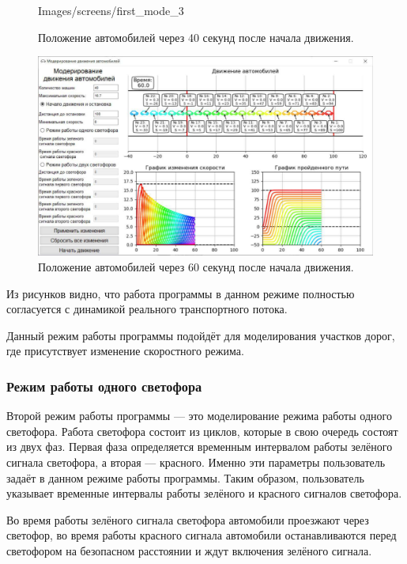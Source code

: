 \documentclass[12pt, a4paper]{extarticle}
\numberwithin{equation}{section}
\numberwithin{figure}{section}
\begin{document}
\begin{figure}[h!]
\begin{center}
\begin{minipage}[h]{0.48\linewidth}
			{Images/screens/first_mode_3}
			\caption{Положение автомобилей через 40 секунд после начала движения.}
			\label{first_mode_3}
		\end{minipage}
			\hfill 
		\begin{minipage}[h]{0.48\linewidth}
			\includegraphics[width=1\linewidth]
			{Images/screens/first_mode_4}
			\caption{Положение автомобилей через 60 секунд после начала движения.}
			\label{first_mode_4}
		\end{minipage}
	\end{center}
\end{figure}

Из рисунков видно, что работа программы в данном режиме полностью согласуется с динамикой реального транспортного потока.

Данный режим работы программы подойдёт для моделирования участков дорог, где присутствует изменение скоростного режима.

\subsubsection{Режим работы одного светофора}

Второй режим работы программы --- это моделирование режима работы одного светофора. Работа светофора состоит из циклов, которые в свою очередь состоят из двух фаз. Первая фаза определяется временным интервалом работы зелёного сигнала светофора, а вторая --- красного. Именно эти параметры пользователь задаёт в данном режиме работы программы. Таким образом, пользователь указывает временные интервалы работы зелёного и красного сигналов светофора. 

Во время работы зелёного сигнала светофора автомобили проезжают через светофор, во время работы красного сигнала автомобили останавливаются перед светофором на безопасном расстоянии и ждут включения зелёного сигнала. 
\end{document}
